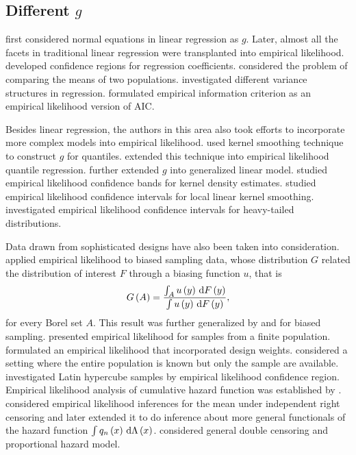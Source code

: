 \subsection{Different $g$ }

\citet{owen1991empirical} first considered normal equations
in linear regression as $g$. Later, almost all the facets in traditional
linear regression were transplanted into empirical likelihood. \citet{chen1993accuracy,chen1994empirical}
developed confidence regions for regression coefficients. \citet{jing1995two,adimari1995empirical}
considered the problem of comparing the means of two populations.
\citet{davidian1987variance} investigated different variance structures
in regression. \citet{kolaczyk1995information} formulated empirical
information criterion as an empirical likelihood version of AIC. 

Besides linear regression, the authors in this area also took efforts
to incorporate more complex models into empirical likelihood. \citet{chen1993smoothed}
used kernel smoothing technique to construct $g$ for quantiles. \citet{whang2006smoothed}
extended this technique into empirical likelihood quantile regression.
\citet{kolaczyk1994empirical} further extended $g$ into generalized
linear model. \citet{hall1993empirical} studied empirical likelihood
confidence bands for kernel density estimates. \citet{chen2000empirical}
studied empirical likelihood confidence intervals for local linear
kernel smoothing. \citet{peng2004empirical} investigated empirical
likelihood confidence intervals for heavy-tailed distributions.

Data drawn from sophisticated designs have also been taken into consideration.
\citet{qin1993empirical} applied empirical likelihood to biased sampling
data, whose distribution $G$ related the distribution of interest
$F$ through a biasing function $u$, that is
\[
G\left(A\right)=\frac{\int_{A}u\left(y\right)\,\mathrm{d} F\left(y\right)}{\int u\left(y\right)\,\mathrm{d} F\left(y\right)},
\]
for every Borel set $A$.
This result was further generalized by \citet{qin1997goodness,qin1999empirical} and \citet{qin1998semiparametric}
for biased sampling. \citet{chen1993empirical}
presented empirical likelihood for samples from a finite population.
\citet{chen1999pseudo} formulated an empirical likelihood that incorporated
design weights. \citet{wu2001model} considered a setting where the
entire population is known but only the sample are available. \citet{loh1996latin}
investigated Latin hypercube samples by empirical likelihood confidence
region. Empirical likelihood analysis of cumulative hazard function
was established by \citet{murphy1995likelihood}. \citet{adimari1997empirical}
considered empirical likelihood inferences for the mean under independent
right censoring and later \citet{pan2002empirical} extended it to
do inference about more general functionals of the hazard function
$\int q_{n}\left(x\right)\,\mathrm{d}\Lambda\left(x\right)$. \citet{murphy1997semiparametric}
considered general double censoring and proportional hazard
model.

